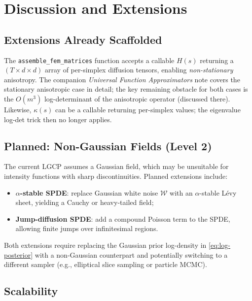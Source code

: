 \documentclass[11pt]{article}
\begin{document}
\section{Discussion and Extensions}

\subsection{Extensions Already Scaffolded}

The \texttt{assemble\_fem\_matrices} function accepts a callable $H(s)$
returning a $(T \times d \times d)$ array of per-simplex diffusion tensors,
enabling \emph{non-stationary} anisotropy.  The companion \emph{Universal
Function Approximators} note covers the stationary anisotropic case in detail;
the key remaining obstacle for both cases is the $O(m^3)$ log-determinant of the
anisotropic operator (discussed there).
Likewise, $\kappa(s)$ can be a callable returning per-simplex values; the
eigenvalue log-det trick then no longer applies.

\subsection{Planned: Non-Gaussian Fields (Level 2)}

The current LGCP assumes a Gaussian field, which may be unsuitable for intensity
functions with sharp discontinuities.  Planned extensions include:
\begin{itemize}
  \item \textbf{$\alpha$-stable SPDE}: replace Gaussian white noise $\mathcal{W}$
    with an $\alpha$-stable L\'evy sheet, yielding a Cauchy or heavy-tailed field;
  \item \textbf{Jump-diffusion SPDE}: add a compound Poisson term to the SPDE,
    allowing finite jumps over infinitesimal regions.
\end{itemize}

Both extensions require replacing the Gaussian prior log-density in
\eqref{eq:log-posterior} with a non-Gaussian counterpart and potentially
switching to a different sampler (e.g., elliptical slice sampling or particle
MCMC).

\subsection{Scalability}
\end{document}
